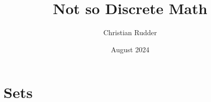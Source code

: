 \documentclass{article}
\title{Not so Discrete Math}
\author{Christian Rudder}
\date{August 2024}
\begin{document}
\maketitle

\section{Sets}


\end{document}

